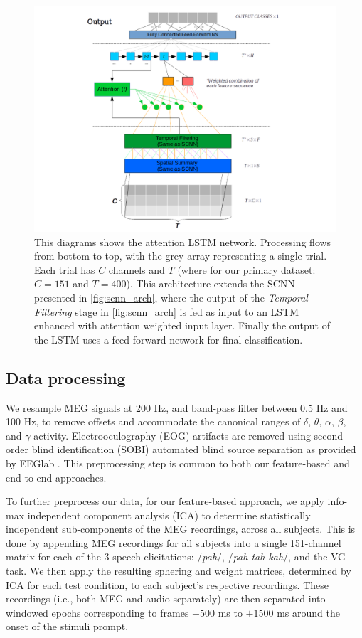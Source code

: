 \documentclass[utf8]{frontiersSCNS} %
\begin{document}
\begin{figure}[htp]
  \includegraphics[width=\columnwidth]{ALSTM_architecture.png}
  \caption{This diagrams shows the attention LSTM network. Processing flows from bottom to top, with the grey array representing a single trial. Each trial has $C$ channels and $T$ (where for our primary dataset: $C=151$ and $T=400$). This architecture extends the SCNN presented in \ref{fig:scnn_arch}, where the output of the {\em Temporal Filtering} stage in \ref{fig:scnn_arch} is fed as input to an LSTM enhanced with attention weighted input layer. Finally the output of the LSTM uses a feed-forward network for final classification.}
  \label{fig:alstm_arch}
\end{figure}

\subsection{Data processing}

We resample MEG signals at 200 Hz, and band-pass filter between 0.5 Hz and 100 Hz, to remove offsets and accommodate the canonical ranges of $\delta$, $\theta$, $\alpha$, $\beta$, and $\gamma$ activity. Electrooculography (EOG) artifacts are removed using second order blind identification (SOBI) automated blind source separation as provided by EEGlab \cite{Delorme04eeglab}. This preprocessing step is common to both our feature-based and end-to-end approaches.

To further preprocess our data, for our feature-based approach, we apply info-max independent component analysis (ICA) \cite{Bell1995} to determine statistically independent sub-components of the MEG recordings, across all subjects. This is done by appending MEG recordings for all subjects into a single 151-channel matrix for each of the 3 speech-elicitations: /{\em pah}/, /{\em pah tah kah}/, and the VG task. We then apply the resulting sphering and weight matrices, determined by ICA for each test condition, to each subject's respective recordings. These recordings (i.e., both MEG and audio separately) are then separated into windowed epochs corresponding to frames $-500$ ms to $+1500$ ms around the onset of the stimuli prompt.
\end{document}
